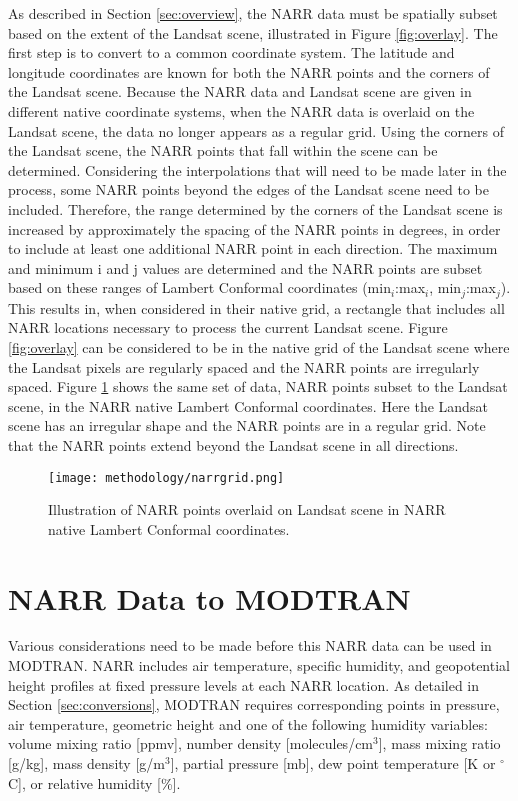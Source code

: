 \documentclass{book}
\begin{document}
As described in Section \ref{sec:overview}, the NARR data must be spatially subset based on the extent of the Landsat scene, illustrated in Figure \ref{fig:overlay}.  The first step is to convert to a common coordinate system.  The latitude and longitude coordinates are known for both the NARR points and the corners of the Landsat scene.  Because the NARR data and Landsat scene are given in different native coordinate systems, when the NARR data is overlaid on the Landsat scene, the data no longer appears as a regular grid.  Using the corners of the Landsat scene, the NARR points that fall within the scene can be determined.  Considering the interpolations that will need to be made later in the process, some NARR points beyond the edges of the Landsat scene need to be included.  Therefore, the range determined by the corners of the Landsat scene is increased by approximately the spacing of the NARR points in degrees, in order to include at least one additional NARR point in each direction.  The maximum and minimum i and j values are determined and the NARR points are subset based on these ranges of Lambert Conformal coordinates (min$_i$:max$_i$, min$_j$:max$_j$).  This results in, when considered in their native grid, a rectangle that includes all NARR locations necessary to process the current Landsat scene.  Figure \ref{fig:overlay} can be considered to be in the native grid of the Landsat scene where the Landsat pixels are regularly spaced and the NARR points are irregularly spaced.  Figure \ref{fig:narrgrid} shows the same set of data, NARR points subset to the Landsat scene, in the NARR native Lambert Conformal coordinates.  Here the Landsat scene has an irregular shape and the NARR points are in a regular grid.  Note that the NARR points extend beyond the Landsat scene in all directions.

\begin{figure}[H]
\centering
\texttt{[image: methodology/narrgrid.png]}
\caption{Illustration of NARR points overlaid on Landsat scene in NARR native Lambert Conformal coordinates.}
\label{fig:narrgrid}
\end{figure}

\section{NARR Data to MODTRAN}
\label{sec:narrdatatomodtran}

Various considerations need to be made before this NARR data can be used in MODTRAN.  NARR includes air temperature, specific humidity, and geopotential height profiles at fixed pressure levels at each NARR location.  As detailed in Section \ref{sec:conversions}, MODTRAN requires corresponding points in pressure, air temperature, geometric height and one of the following humidity variables: volume mixing ratio [ppmv], number density [molecules/cm$^3$], mass mixing ratio [g/kg], mass density [g/m$^3$], partial pressure [mb], dew point temperature [K or $^\circ$C], or relative humidity [\%].
\end{document}
